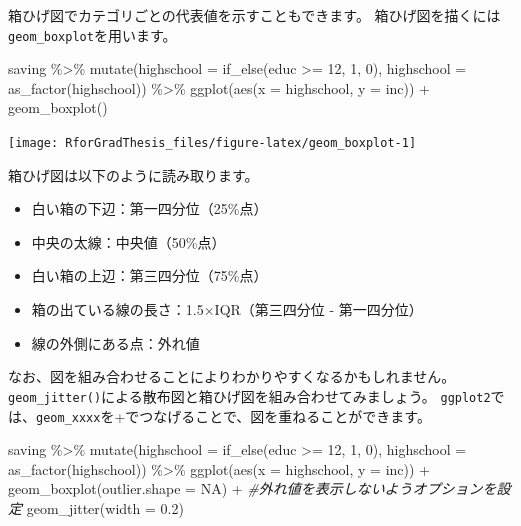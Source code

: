 \documentclass[
]{book}
\newenvironment{Shaded}{\begin{snugshade}}{\end{snugshade}}
\newcommand{\AttributeTok}[1]{\textcolor[rgb]{0.77,0.63,0.00}{#1}}
\newcommand{\CommentTok}[1]{\textcolor[rgb]{0.56,0.35,0.01}{\textit{#1}}}
\newcommand{\ConstantTok}[1]{\textcolor[rgb]{0.00,0.00,0.00}{#1}}
\newcommand{\DecValTok}[1]{\textcolor[rgb]{0.00,0.00,0.81}{#1}}
\newcommand{\FloatTok}[1]{\textcolor[rgb]{0.00,0.00,0.81}{#1}}
\newcommand{\FunctionTok}[1]{\textcolor[rgb]{0.00,0.00,0.00}{#1}}
\newcommand{\NormalTok}[1]{#1}
\newcommand{\SpecialCharTok}[1]{\textcolor[rgb]{0.00,0.00,0.00}{#1}}
\providecommand{\tightlist}{%
  \setlength{\itemsep}{0pt}\setlength{\parskip}{0pt}}
\begin{document}
箱ひげ図でカテゴリごとの代表値を示すこともできます。
箱ひげ図を描くには\texttt{geom\_boxplot}を用います。

\begin{Shaded}
\begin{Highlighting}[]
\NormalTok{saving }\SpecialCharTok{\%\textgreater{}\%}
  \FunctionTok{mutate}\NormalTok{(}\AttributeTok{highschool =} \FunctionTok{if\_else}\NormalTok{(educ }\SpecialCharTok{\textgreater{}=} \DecValTok{12}\NormalTok{, }\DecValTok{1}\NormalTok{, }\DecValTok{0}\NormalTok{),}
         \AttributeTok{highschool =} \FunctionTok{as\_factor}\NormalTok{(highschool)) }\SpecialCharTok{\%\textgreater{}\%}
  \FunctionTok{ggplot}\NormalTok{(}\FunctionTok{aes}\NormalTok{(}\AttributeTok{x =}\NormalTok{ highschool, }\AttributeTok{y =}\NormalTok{ inc)) }\SpecialCharTok{+}
  \FunctionTok{geom\_boxplot}\NormalTok{()}
\end{Highlighting}
\end{Shaded}

\begin{center}\texttt{[image: RforGradThesis\_files/figure-latex/geom\_boxplot-1]} \end{center}

箱ひげ図は以下のように読み取ります。

\begin{itemize}
\tightlist
\item
  白い箱の下辺：第一四分位（25\%点）
\item
  中央の太線：中央値（50\%点）
\item
  白い箱の上辺：第三四分位（75\%点）
\item
  箱の出ている線の長さ：1.5×IQR（第三四分位 - 第一四分位）
\item
  線の外側にある点：外れ値
\end{itemize}

なお、図を組み合わせることによりわかりやすくなるかもしれません。
\texttt{geom\_jitter()}による散布図と箱ひげ図を組み合わせてみましょう。
\texttt{ggplot2}では、\texttt{geom\_xxxx}を+でつなげることで、図を重ねることができます。

\begin{Shaded}
\begin{Highlighting}[]
\NormalTok{saving }\SpecialCharTok{\%\textgreater{}\%}
  \FunctionTok{mutate}\NormalTok{(}\AttributeTok{highschool =} \FunctionTok{if\_else}\NormalTok{(educ }\SpecialCharTok{\textgreater{}=} \DecValTok{12}\NormalTok{, }\DecValTok{1}\NormalTok{, }\DecValTok{0}\NormalTok{),}
         \AttributeTok{highschool =} \FunctionTok{as\_factor}\NormalTok{(highschool)) }\SpecialCharTok{\%\textgreater{}\%}
  \FunctionTok{ggplot}\NormalTok{(}\FunctionTok{aes}\NormalTok{(}\AttributeTok{x =}\NormalTok{ highschool, }\AttributeTok{y =}\NormalTok{ inc)) }\SpecialCharTok{+}
  \FunctionTok{geom\_boxplot}\NormalTok{(}\AttributeTok{outlier.shape =} \ConstantTok{NA}\NormalTok{) }\SpecialCharTok{+} \CommentTok{\#外れ値を表示しないようオプションを設定}
  \FunctionTok{geom\_jitter}\NormalTok{(}\AttributeTok{width =} \FloatTok{0.2}\NormalTok{)}
\end{Highlighting}
\end{Shaded}
\end{document}

